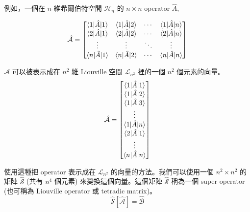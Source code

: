 \documentclass[11pt,a4paper]{article}
\begin{document}
例如，一個在 $n$-維希爾伯特空間 $\mathcal{H}_{n}$ 的 $n \times n$ operator $\hat{A}$,

\begin{equation}
\hat{\mathcal{A}} =
\begin{bmatrix}
\braket{ 1 | \hat{A}|1 } & \braket{ 1 | \hat{A}|2 } & \cdots & \braket{ 1 | \hat{A}|n } \\
\braket{ 2 | \hat{A}|1 } & \braket{ 2 | \hat{A}|2 } & \cdots & \braket{ 2 | \hat{A}|n } \\
\vdots  & \vdots  & \ddots & \vdots  \\
\braket{ n | \hat{A}|1 } & \braket{ n | \hat{A}|2 } & \cdots & \braket{ n | \hat{A}|n }
\end{bmatrix}
\end{equation}

$\hat{\mathcal{A}}$ 可以被表示成在 $n^2$ 維 Liouville 空間 $\mathcal{L}_{n^2}$ 裡的一個 $n^2$ 個元素的向量。\\

\begin{equation}
\hat{\mathcal{A}} =
\begin{bmatrix}
\braket{ 1 | \hat{A}|1 }\\
\braket{ 1 | \hat{A}|2 }\\
\braket{ 1 | \hat{A}|3 }\\
\vdots\\
\braket{ 1 | \hat{A}|n }\\
\braket{ 2 | \hat{A}|1 }\\
\vdots\\
\braket{ n | \hat{A}|n }\\
\end{bmatrix}
\end{equation}

使用這種把 operator 表示成在 $\mathcal{L}_{n^2}$ 的向量的方法。我們可以使用一個 $n^2 \times n^2$ 的矩陣 $\hat{\mathcal{S}}$ (共有 $n^4$ 個元素) 來變換這個向量。這個矩陣 $\hat{\mathcal{S}}$ 稱為一個 super operator (也可稱為 Liouville operator 或 tetradic matrix)。\\

\begin{equation}
\hat{\mathcal{S}} \left[ \hat{\mathcal{A}} \right] = \hat{\mathcal{B}}
\end{equation}
\end{document}
